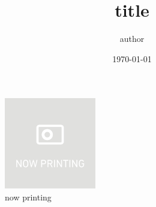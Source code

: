 \documentclass[dvipdfmx, paper=a4, fontsize=10pt]{jlreq}
\title{title}
\author{author}
\date{\today}
\begin{document}
    \maketitle

    \begin{figure}
        \centering
        \includegraphics[width=40mm]{figs/nowprinting.png}
        \caption{now printing}
    \end{figure}

    \cite{sakaguchi2022quad}

    
    
\end{document}

